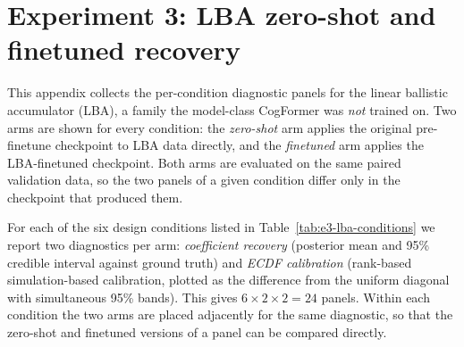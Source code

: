 %
%
%
%

\renewcommand{\topfraction}{0.92}
\renewcommand{\bottomfraction}{0.7}
\renewcommand{\textfraction}{0.06}
\renewcommand{\floatpagefraction}{0.6}

\section{Experiment 3: LBA zero-shot and finetuned recovery}
\label{app:experiment-3-lba-figures}

This appendix collects the per-condition diagnostic panels for the linear
ballistic accumulator (LBA), a family the model-class CogFormer was \emph{not}
trained on. Two arms are shown for every condition: the \emph{zero-shot} arm
applies the original pre-finetune checkpoint to LBA data directly, and the
\emph{finetuned} arm applies the LBA-finetuned checkpoint. Both arms are
evaluated on the same paired validation data, so the two panels of a given
condition differ only in the checkpoint that produced them.

For each of the six design conditions listed in
Table~\ref{tab:e3-lba-conditions} we report two diagnostics per arm:
\emph{coefficient recovery} (posterior mean and 95\% credible interval against
ground truth) and \emph{ECDF calibration} (rank-based simulation-based
calibration, plotted as the difference from the uniform diagonal with
simultaneous 95\% bands). This gives $6 \times 2 \times 2 = 24$ panels. Within
each condition the two arms are placed adjacently for the same diagnostic, so
that the zero-shot and finetuned versions of a panel can be compared directly.


